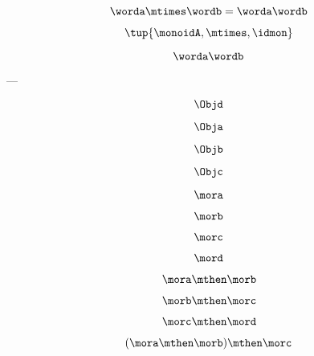 {\begin{forslides}
  \begin{equation*}  \label{eq:string-semigroup-wordab-2}
    \worda \mtimes  \wordb =  \worda \wordb
  \end{equation*}


  $$ \tup{ \monoidA, \mtimes, \idmon} $$


  \begin{equation*} \label{eq:string-semigroup-wordab-concat-2}
     \worda \wordb
  \end{equation*}
 
 ---
    
\begin{equation}\label{eq:00}
 \Objd
 \end{equation}   
    
 \begin{equation}\label{eq:01}
 \Obja
 \end{equation}
 
  \begin{equation}\label{eq:02}
 \Objb
 \end{equation}
  
 \begin{equation}\label{eq:03}
 \Objc
 \end{equation}
 
 \begin{equation}\label{eq:04}
 \mora
 \end{equation}
 
  \begin{equation}\label{eq:05}
 \morb
 \end{equation}
 
  \begin{equation}\label{eq:06}
 \morc
 \end{equation}
 
  \begin{equation}\label{eq:07}
 \mord
 \end{equation}
 
 \begin{equation}\label{eq:08}
 \mora \mthen \morb
 \end{equation}
 
  \begin{equation}\label{eq:09}
 \morb \mthen \morc
 \end{equation}
 
 \begin{equation}\label{eq:10}
 \morc \mthen \mord
 \end{equation}
 
  \begin{equation}\label{eq:11}
 (\mora \mthen \morb) \mthen \morc
 \end{equation}
 

\end{forslides}}
